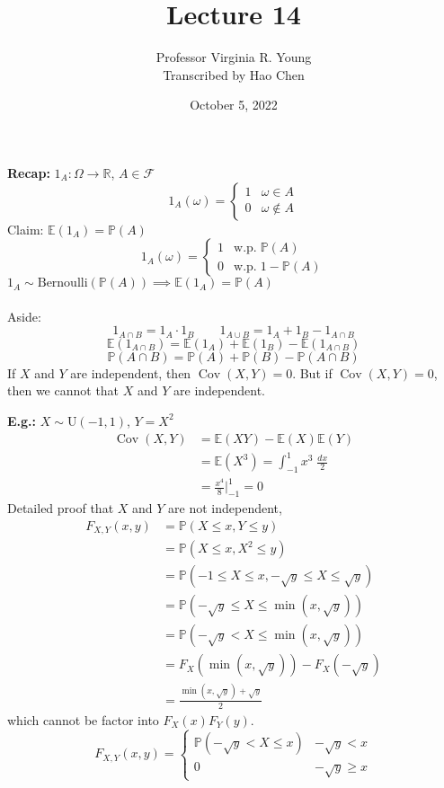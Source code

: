 \documentclass[a4paper]{article}
\title{Lecture 14}
\author{Professor Virginia R. Young\\ \small{Transcribed by Hao Chen}}
\date{October 5, 2022}
\newcommand{\n}{\hfill\break}
\newcommand{\recap}[1]{\par\noindent\settowidth{\hangindent}{\textbf{Recap: }}\textbf{Recap: }#1\n}
\newcommand{\eg}[1]{\par\noindent\settowidth{\hangindent}{\textbf{E.g.: }}\textbf{E.g.: }#1\n}
\newcommand{\reals}{\mathbb{R}}
\newcommand{\R}{\reals}
\newcommand{\F}{\mathcal F}
\newcommand{\Prob}{\mathbb{P}}
\renewcommand{\P}{\Prob}
\newcommand{\Avg}{\mathbb{E}}
\newcommand{\E}{\Avg}
\DeclareMathOperator{\Cov}{Cov}
\begin{document}
\maketitle

\recap{
    $1_A:\Omega\rightarrow\R$, $A\in\F$
    \[1_A(\omega)=\left\{\begin{array}{lc}1&\omega\in A\\0&\omega\notin A\end{array}\right.\]
    Claim: $\E(1_A)=\P(A)$
    \[1_A(\omega)=\left\{\begin{array}{ll}1&\text{w.p.}\;\P(A)\\0&\text{w.p.}\;1-\P(A)\end{array}\right.\]
    $1_A\sim\text{Bernoulli}(\P(A)) \implies \E(1_A)=\P(A)$
    \\\\
    Aside: \[1_{A\cap B}=1_A\cdot 1_B\qquad1_{A\cup B}=1_A+1_B-1_{A\cap B}\]
    \[\E(1_{A\cap B})=\E(1_A)+\E(1_B)-\E(1_{A\cap B})\]
    \[\P(A\cap B)=\P(A)+\P(B)-\P(A\cap B)\]
    If $X$ and $Y$ are independent, then $\Cov(X,Y)=0$. But if $\Cov(X,Y)=0$, then we cannot that $X$ and $Y$ are independent.
}

\eg{
    $X\sim\text{U}(-1, 1)$, $Y=X^2$
    \begin{align*}
        \Cov(X,Y)&=\E(XY)-\E(X)\E(Y) \\
        &=\E(X^3)=\int_{-1}^1x^3\;\frac{dx}{2} \\
        &=\frac{x^4}{8}\bigg\vert^1_{-1}=0
    \end{align*}
    Detailed proof that $X$ and $Y$ are not independent,
    \begin{align*}
        F_{X,Y}(x,y)&=\P(X\leq x, Y\leq y) \\
        &=\P(X\leq x, X^2\leq y) \\
        &=\P(-1\leq X\leq x, -\sqrt{y}\leq X\leq \sqrt{y}) \\
        &=\P(-\sqrt{y}\leq X\leq \min(x, \sqrt{y})) \\
        &=\P(-\sqrt{y}< X\leq \min(x, \sqrt{y})) \\
        &=F_X(\min(x, \sqrt{y}))-F_X(-\sqrt{y}) \\
        &=\frac{\min(x, \sqrt{y})+\sqrt{y}}{2}
    \end{align*}
    which cannot be factor into $F_X(x)F_Y(y)$.
     \[F_{X,Y}(x,y)=\left\{\begin{array}{lc}\P(-\sqrt{y}<X\leq x)&-\sqrt{y}<x\\0&-\sqrt{y}\geq x\end{array}\right.\]
}
\end{document}

